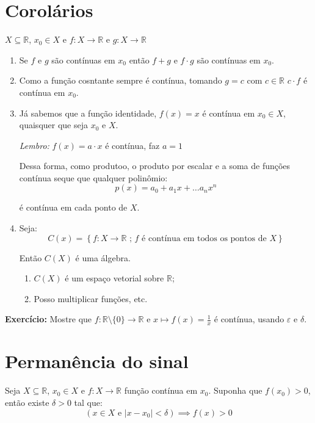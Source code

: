 \documentclass[12pt]{article}
\begin{document}
    \section*{Corolários}
    $X \subseteq \mathbb{R}$, $x_0 \in X$ e $f: X \to \mathbb{R}$ e $g: X \to \mathbb{R}$
    \begin{enumerate}
        \item Se $f$ e $g$ são contínuas em $x_0$ então $f+g$ e $f \cdot g$ são contínuas em $x_0$.
        \item Como a função cosntante sempre é contínua, tomando $g = c$ com $c \in \mathbb{R}$ $c \cdot f$ é contínua em $x_0$.
        \item Já sabemos que a função identidade, $f(x) = x$ é contínua em $x_0 \in X$, quaisquer que seja $x_0$ e $X$.
        
        \textit{Lembro: } $f(x) = a \cdot x $ é contínua, faz $a=1$

        Dessa forma, como produtoo, o produto por escalar e a soma de funções contínua seque que qualquer polinômio:
        \begin{equation*}
            p(x) = a_0 + a_1x + \ldots a_nx^n
        \end{equation*}

        é contínua em cada ponto de $X$.

        \item Seja:
        \begin{equation*}
            C(x) = \left\{ f: X \to \mathbb{R} \text{ ; } f \text{ é contínua em todos os pontos de } X\right\}
        \end{equation*}

        Então $C(X)$ é uma álgebra.
        \begin{enumerate}
            \item $C(X)$ é um espaço vetorial sobre $\mathbb{R}$;
            \item Posso multiplicar funções, etc.
        \end{enumerate}
    \end{enumerate}

    \textbf{Exercício: } Mostre que $f: \mathbb{R}\setminus \{0\} \to \mathbb{R}$ e $x \mapsto f(x) = \frac{1}{x}$ é contínua, usando $\varepsilon$ e $\delta$.

    \section*{Permanência do sinal}
    Seja $X \subseteq \mathbb{R}$, $x_0 \in X$ e $f: X \to \mathbb{R}$ função contínua em $x_0$. Suponha que $f(x_0) > 0$, então existe $\delta > 0$ tal que:
    \begin{equation*}
        \left(x \in X \text{ e } |x - x_0| < \delta \right) \implies f(x) > 0
    \end{equation*}
\end{document}
